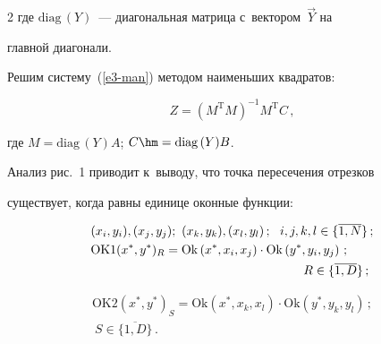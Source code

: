 \begin{multicols}{2}
где $\mathrm{diag}\,(Y)$~--- диагональная мат\-ри\-ца с~вектором~$\vec{Y}$ на 


главной диа\-го\-нали.





  Решим систему~(\ref{e3-man}) методом наименьших квад\-ра\-тов:


  \begin{equation*}


  Z=\left( M^{\mathrm{T}} M\right)^{-1} M^{\mathrm{T}} C\,,




  \end{equation*}


где $M=\mathrm{diag}\,(Y) A$; $C\hm= \mathrm{diag}\,(Y) B$.








      


  Анализ рис.~1 приводит к~выводу, что точка пересечения отрезков 


существует, когда рав\-ны единице оконные функ\-ции:


  \begin{align*}


 & (x_i, y_i), (x_j, y_j); \ (x_k, y_k), (x_l, y_l)\,;\ \ i,j,k,l\in \{\overline{1,N}\}\,;\\


 & \mathrm{OK}1(x^*, y^*)_R =


 \mathrm{Ok}\left(x^*, x_i, x_j\right)\cdot \mathrm{Ok} \left(y^*, y_i, 


y_j\right)\,;\\


 &\hspace*{60mm}R\in\{ \overline{1,D}\}\,;


 \end{align*}


 


 \noindent


 \begin{multline*}


  \mathrm{OK}2\left(x^*, y^*\right)_S= \mathrm{Ok}\left(x^*, x_k, x_l\right)\cdot 


 \mathrm{Ok} (y^*, y_k, y_l)\,;\\


\ S\in \{\overline{1,D}\}\,.


  \end{multline*}



\end{multicols}
